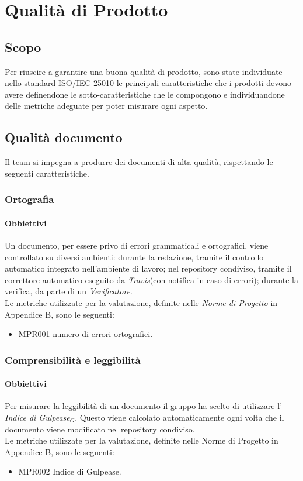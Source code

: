 \chapter{Qualità di Prodotto}
\label{prodotto}
\section{Scopo}
Per riuscire a garantire una buona qualità di prodotto, sono state individuate nello standard ISO/IEC 25010 le principali caratteristiche che i prodotti devono avere definendone le sotto-caratteristiche che le compongono e individuandone delle metriche adeguate per poter misurare ogni aspetto.

\section{Qualità documento}
\label{documento}
Il team si impegna a produrre dei documenti di alta qualità, rispettando le seguenti caratteristiche.
\subsection{Ortografia}
\subsubsection{Obbiettivi}
Un documento, per essere privo di errori grammaticali e ortografici, viene controllato su diversi ambienti: durante la redazione, tramite il controllo automatico integrato nell'ambiente di lavoro; nel repository condiviso, tramite il correttore automatico eseguito da \textit{Travis}(con notifica in caso di errori); durante la verifica, da parte di un \textit{Verificatore}.\\
Le metriche utilizzate per la valutazione, definite nelle \textit{Norme di Progetto} in Appendice B, sono le seguenti:
\begin{itemize}
	\item MPR001 numero di errori ortografici.
\end{itemize}
\subsection{Comprensibilità e leggibilità}
\subsubsection{Obbiettivi}
Per misurare la leggibilità di un documento il gruppo ha scelto di utilizzare l' \textit{Indice di Gulpease$_{G}$}. Questo viene calcolato automaticamente ogni volta che il documento viene modificato nel repository condiviso.\\
Le metriche utilizzate per la valutazione, definite nelle Norme di Progetto in Appendice B, sono le seguenti:
\begin{itemize}
	\item MPR002 Indice di Gulpease.
\end{itemize}
